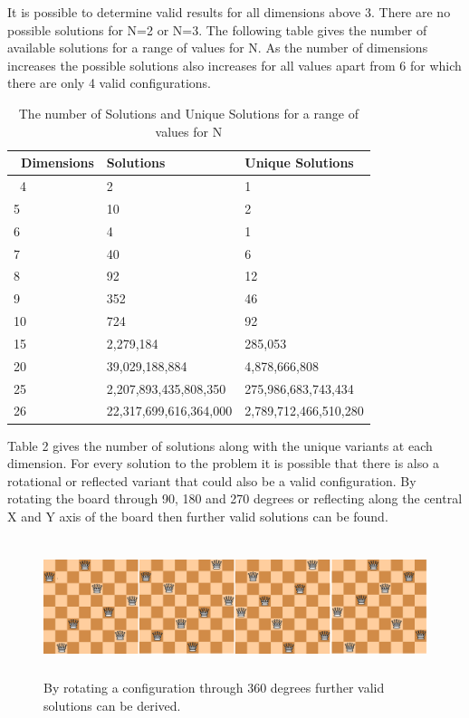 \documentclass[conference]{IEEEtran}
\begin{document}
It is possible to determine valid results for all dimensions above 3. There are no possible solutions for N=2 or N=3. The following table gives the number of available solutions for a range of values for N. As the number of dimensions increases the possible solutions also increases for all values apart from 6 for which there are only 4 valid configurations. 

\begin{table}[ht]
\begin{tabular}{|p{2cm}|p{6cm}|p{6cm}|} 
		\hline\
		Dimensions & Solutions & Unique Solutions \\
		\hline\
		4 & 2 & 1 \\ 
		5 & 10 & 2 \\
		6 & 4 & 1 \\
		7 & 40 & 6 \\
		8 & 92 & 12 \\
		9 & 352 & 46 \\
		10 & 724 & 92 \\
		15 & 2,279,184 & 285,053 \\
		20 & 39,029,188,884 & 4,878,666,808 \\
		25 & 2,207,893,435,808,350  & 275,986,683,743,434 \\
		26 & 22,317,699,616,364,000 & 2,789,712,466,510,280 \\
		\hline
	\end{tabular}
	\caption{The number of Solutions and Unique Solutions for a range of values for N}
\end{table}

Table 2 gives the number of solutions along with the unique variants at each dimension. For every solution to the problem it is possible that there is also a rotational or reflected variant that could also be a valid configuration. By rotating the board through 90, 180 and 270 degrees or reflecting along the central X and Y axis of the board then further valid solutions can be found.

\begin{figure}[!htbp]
	\centering	
	\includegraphics[width=16cm, height=4cm]{NQueensRotations}
	\caption{By rotating a configuration through 360 degrees further valid solutions can be derived.}
\end{figure}
\end{document}
